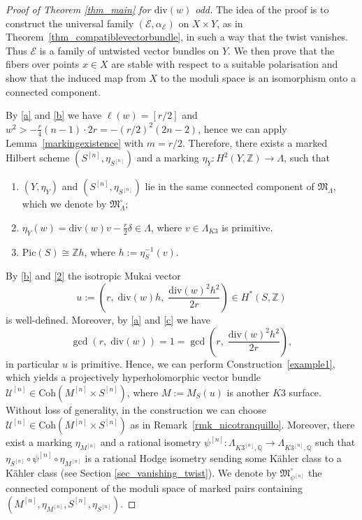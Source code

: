 \documentclass[12pt,a4paper]{amsart}
\theoremstyle{plain}
\theoremstyle{definition}
\theoremstyle{remark}
\def\Pic{\mathrm{Pic}}
\def\Coh{\mathrm{Coh}}
\def\Z{\mathbb{Z}}
\def\H{H}
\newcommand{\kE}{\mathcal{E}}
\newcommand{\ZZ}{\mathbb{Z}}
\newcommand{\dv}{\mathrm{div}}
\newcommand{\Lambdan}{{\Lambda}}
\newcommand{\psin}{{\psi^{[n]}}}
\begin{document}
\begin{proof}[Proof of Theorem \ref{thm_main} for $\dv(w)$ odd]
The idea of the proof is to construct the universal family $(\kE,\alpha_\kE)$ on $X \times Y$, as in Theorem~\ref{thm_compatiblevectorbundle}, in such a way that the twist vanishes. Thus $\kE$ is a family of untwisted vector bundles on $Y$. We then prove that the fibers over points $x \in X$ are stable with respect to a suitable polarisation and show that the induced map from $X$ to the moduli space is an isomorphism onto a connected component.

By \ref{a} and \ref{b} we have $\ell(w)=\left[r/2\right]$ and $w^2 > -\frac{r}{4}(n-1)\cdot 2r = -(r/2)^2(2n-2)$, hence we can apply Lemma~\ref{markingexistence} with $m = r/2$. Therefore, there exists a marked Hilbert scheme $(S^{[n]},\eta_{S^{[n]}})$ and a marking $\eta_Y\colon \H^2(Y,\mathbb{Z})\rightarrow \Lambdan$, such that
\begin{enumerate}[label=(\arabic*)]
    \item $(Y,\eta_Y)$ and $(S^{[n]},\eta_{S^{[n]}})$ lie in the same connected component of $\mathfrak{M}_\Lambdan$, which we denote by $\mathfrak{M}^\circ_\Lambdan$;
    \item\label{2} $\eta_Y(w)=\dv(w)v-\frac{r}{2}\delta\in\Lambdan$, where $v\in\Lambda_{K3}$ is primitive.
    \item\label{3} $\Pic(S)\cong \Z h$, where $h:=\eta_S^{-1}(v)$.
\end{enumerate}
By \ref{b} and \ref{2} the isotropic Mukai vector 
\begin{equation}\label{Mukai_odd}
    u:= \left(r,\;\dv(w)h,\;\frac{\dv(w)^2h^2}{2r}\right) \in \H^{\ast}(S,\ZZ)
\end{equation} 
is well-defined.
Moreover, by \ref{a} and \ref{c} we have
$$\gcd(r,\;\dv(w))=1=\gcd\left(r,\;\frac{\dv(w)^2h^2}{2r}\right),$$
in particular $u$ is primitive.
Hence, we can perform Construction~\ref{example1}, which yields a projectively hyperholomorphic vector bundle $\mathcal{U}^{[n]} \in \Coh(M^{[n]}\times S^{[n]})$, where $M:= M_S(u)$ is another $K3$ surface. Without loss of generality, in the construction we can choose $\mathcal{U}^{[n]}\in\Coh(M^{[n]}\times S^{[n]})$ as in Remark~\ref{rmk_nicotranquillo}. Moreover, there exist a marking $\eta_{M^{[n]}}$ and a rational isometry $\psin \colon \Lambda_{K3^{[n]},\mathbb{Q}} \to \Lambda_{K3^{[n]},\mathbb{Q}}$ such that $\eta_{S^{[n]}} \circ \psin \circ \eta_{M^{[n]}}$ is a rational Hodge isometry sending some K\"ahler class to a K\"ahler class (see Section \ref{sec_vanishing_twist}). We denote by $\mathfrak{M}^\circ_{\psin}$ the connected component of the moduli space of marked pairs containing $(M^{[n]},\eta_{M^{[n]}},S^{[n]},\eta_{S^{[n]}})$.


\end{proof}
\end{document}
